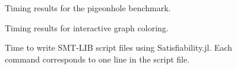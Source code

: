 \documentclass{article}
\begin{document}
\begin{figure}[h!]
	\centering
	
	\caption{Timing results for the pigeonhole benchmark.}
	\label{fig:pigeons}
\end{figure}
%
\begin{figure}[h!]
	\centering
	
	\caption{Timing results for interactive graph coloring.}
	\label{fig:graph}
\end{figure}
\begin{figure}[h]
	\centering
	
	\caption{Time to write SMT-LIB script files using Satisfiability.jl. Each command corresponds to one line in the script file.}
	\label{fig:filesize}
\end{figure}
\end{document}
